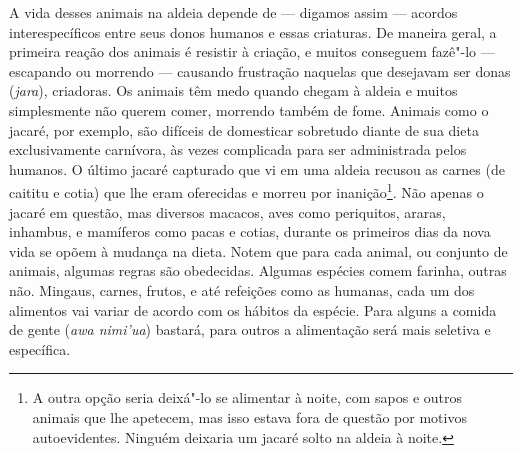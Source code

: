 A vida desses animais na aldeia depende de --- digamos assim --- acordos
interespecíficos entre seus donos humanos e essas criaturas. De maneira
geral, a primeira reação dos animais é resistir à criação, e muitos
conseguem fazê"-lo --- escapando ou morrendo --- causando frustração naquelas
que desejavam ser donas (\emph{jara}), criadoras. Os animais têm medo
quando chegam à aldeia e muitos simplesmente não querem comer, morrendo
também de fome. Animais como o jacaré, por exemplo, são difíceis de
domesticar sobretudo diante de sua dieta exclusivamente carnívora, às
vezes complicada para ser administrada pelos humanos. O último jacaré
capturado que vi em uma aldeia recusou as carnes (de caititu e cotia)
que lhe eram oferecidas e morreu por inanição\footnote{A outra opção
  seria deixá"-lo se alimentar à noite, com sapos e outros animais que
  lhe apetecem, mas isso estava fora de questão por motivos
  autoevidentes. Ninguém deixaria um jacaré solto na aldeia à noite.}.
Não apenas o jacaré em questão, mas diversos macacos, aves como
periquitos, araras, inhambus, e mamíferos como pacas e cotias, durante
os primeiros dias da nova vida se opõem à mudança na dieta. Notem que
para cada animal, ou conjunto de animais, algumas regras são obedecidas.
Algumas espécies comem farinha, outras não. Mingaus, carnes, frutos, e
até refeições como as humanas, cada um dos alimentos vai variar de
acordo com os hábitos da espécie. Para alguns a comida de gente
(\emph{awa nimi'ua}) bastará, para outros a alimentação será mais
seletiva e específica.

